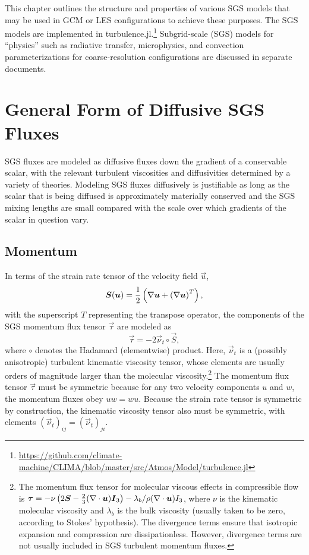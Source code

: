 \documentclass{report}
\begin{document}
This chapter outlines the structure and properties of various SGS models that may be used in GCM or LES configurations to achieve these purposes. The SGS models are implemented in turbulence.jl.\footnote{\url{https://github.com/climate-machine/CLIMA/blob/master/src/Atmos/Model/turbulence.jl}} Subgrid-scale (SGS) models for ``physics'' such as radiative transfer, microphysics, and convection parameterizations for coarse-resolution configurations are discussed in  separate documents. 

\section{General Form of Diffusive SGS Fluxes}\label{s:sgs_fluxes_form}

SGS fluxes are modeled as diffusive fluxes down the gradient of a conservable scalar, with the relevant turbulent viscosities and diffusivities determined by a variety of theories. Modeling SGS fluxes diffusively is justifiable as long as the scalar that is being diffused is approximately materially conserved and the SGS mixing lengths are small compared with the scale over which gradients of the scalar in question vary. 

\subsection{Momentum}

In terms of the strain rate tensor of the velocity field $\vec{u}$,
\begin{equation}\label{e:strain_rate}
\boldsymbol{{S}}(\boldsymbol{{u}}) = \frac{1}{2}  \left(\nabla \boldsymbol{{u}} +  \left( \nabla \boldsymbol{{u}} \right)^T \right),
\end{equation}
with the superscript $T$ representing the transpose operator, the components of the SGS momentum flux tensor $\vec{\tau}$ are modeled as
\begin{equation}\label{e:sgs_momentum_flux}
\vec{\tau} =  - 2 \vec{\nu}_t \circ \vec{S},
\end{equation}
where $\circ$ denotes the Hadamard (elementwise) product. Here, $\vec{\nu}_t$ is a (possibly anisotropic) turbulent kinematic viscosity tensor, whose elements are usually orders of magnitude larger than the molecular viscosity.\footnote{The momentum flux tensor for molecular viscous effects in compressible flow is $\boldsymbol{{\tau}}  =  - \nu \left( 2\boldsymbol{{S}}  - \frac{2}{3} (\nabla \cdot \boldsymbol{{u}}) \boldsymbol{{I}}_3 \right) - \lambda_b/\rho (\nabla \cdot \boldsymbol{{u}}) I_3$, where $\nu$ is the kinematic molecular viscosity and $\lambda_b$ is the bulk viscosity (usually taken to be zero, according to Stokes' hypothesis). The divergence terms ensure that isotropic expansion and compression are dissipationless. However, divergence terms are not usually included in SGS turbulent momentum fluxes.} The momentum flux tensor $\vec{\tau}$ must be symmetric because for any two velocity components $u$ and $w$, the momentum fluxes obey $uw = wu$. Because the strain rate tensor is symmetric by construction, the kinematic viscosity tensor also must be symmetric, with elements $(\vec{\nu}_t)_{ij} = (\vec{\nu}_t)_{ji}$.
\end{document}
